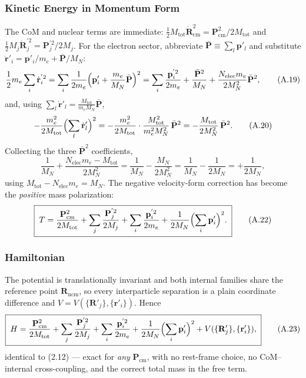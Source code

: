 \subsubsection*{Kinetic Energy in Momentum Form}

The CoM and nuclear terms are immediate: $\frac12 M_{\mathrm{tot}}\dot{\mathbf R}_{\mathrm{cm}}^2 = \mathbf P_{\mathrm{cm}}^2/2M_{\mathrm{tot}}$ and $\frac12 M_j\dot{\mathbf R}_j^{'2} = \mathbf P_j^{'2}/2M_j$. For the electron sector, abbreviate $\bar{\mathbf P}\equiv\sum_l\mathbf p'_l$ and substitute $\dot{\mathbf r}'_i = \mathbf p'_i/m_e + \bar{\mathbf P}/M_N$:
\begin{equation}
\frac12 m_e\sum_i\dot{\mathbf r}_i^{'2}
= \sum_i\frac{1}{2m_e}\Bigl(\mathbf p'_i + \frac{m_e}{M_N}\bar{\mathbf P}\Bigr)^2
= \sum_i\frac{\mathbf p_i^{'2}}{2m_e} + \frac{\bar{\mathbf P}^2}{M_N} + \frac{N_{\mathrm{elec}}m_e}{2M_N^2}\bar{\mathbf P}^2 , \tag{A.19}
\end{equation}
and, using $\sum_l\dot{\mathbf r}'_l = \frac{M_{\mathrm{tot}}}{m_e M_N}\bar{\mathbf P}$,
\begin{equation}
-\frac{m_e^2}{2M_{\mathrm{tot}}}\Bigl(\sum_l\dot{\mathbf r}'_l\Bigr)^2
= -\frac{m_e^2}{2M_{\mathrm{tot}}}\cdot\frac{M_{\mathrm{tot}}^2}{m_e^2 M_N^2}\,\bar{\mathbf P}^2
= -\frac{M_{\mathrm{tot}}}{2M_N^2}\,\bar{\mathbf P}^2 . \tag{A.20}
\end{equation}
Collecting the three $\bar{\mathbf P}^2$ coefficients,
\begin{equation}
\frac{1}{M_N} + \frac{N_{\mathrm{elec}}m_e - M_{\mathrm{tot}}}{2M_N^2}
= \frac{1}{M_N} - \frac{M_N}{2M_N^2}
= \frac{1}{M_N} - \frac{1}{2M_N}
= +\frac{1}{2M_N} , \tag{A.21}
\end{equation}
using $M_{\mathrm{tot}} - N_{\mathrm{elec}}m_e = M_N$. The negative velocity-form correction has become the \emph{positive} mass polarization:
\begin{equation}
\boxed{\;
T = \frac{\mathbf P_{\mathrm{cm}}^2}{2M_{\mathrm{tot}}}
+ \sum_j\frac{\mathbf P_j^{'2}}{2M_j}
+ \sum_i\frac{\mathbf p_i^{'2}}{2m_e}
+ \frac{1}{2M_N}\Bigl(\sum_i\mathbf p'_i\Bigr)^2 .
\;} \tag{A.22}
\end{equation}

\subsubsection*{Hamiltonian}

The potential is translationally invariant and both internal families share the reference point $\mathbf R_{\mathrm{ncm}}$, so every interparticle separation is a plain coordinate difference and $V = V(\{\mathbf R'_j\},\{\mathbf r'_i\})$. Hence
\begin{equation}
\boxed{\;
H = \frac{\mathbf P_{\mathrm{cm}}^2}{2M_{\mathrm{tot}}}
+ \sum_j\frac{\mathbf P_j^{'2}}{2M_j}
+ \sum_i\frac{\mathbf p_i^{'2}}{2m_e}
+ \frac{1}{2M_N}\Bigl(\sum_i\mathbf p'_i\Bigr)^2
+ V(\{\mathbf R'_j\},\{\mathbf r'_i\}) ,
\;} \tag{A.23}
\end{equation}
identical to (2.12) --- exact for \emph{any} $\mathbf P_{\mathrm{cm}}$, with no rest-frame choice, no CoM--internal cross-coupling, and the correct total mass in the free term.

